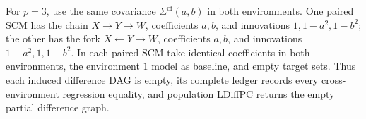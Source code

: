 For \(p=3\), use the same covariance \(\Sigma^{\mathrm{cf}}(a,b)\) in both environments. One paired SCM has the chain \(X\to Y\to W\), coefficients \(a,b\), and innovations \(1,1-a^2,1-b^2\); the other has the fork \(X\leftarrow Y\to W\), coefficients \(a,b\), and innovations \(1-a^2,1,1-b^2\). In each paired SCM take identical coefficients in both environments, the environment \(1\) model as baseline, and empty target sets. Thus each induced difference DAG is empty, its complete ledger records every cross-environment regression equality, and population LDiffPC returns the empty partial difference graph.